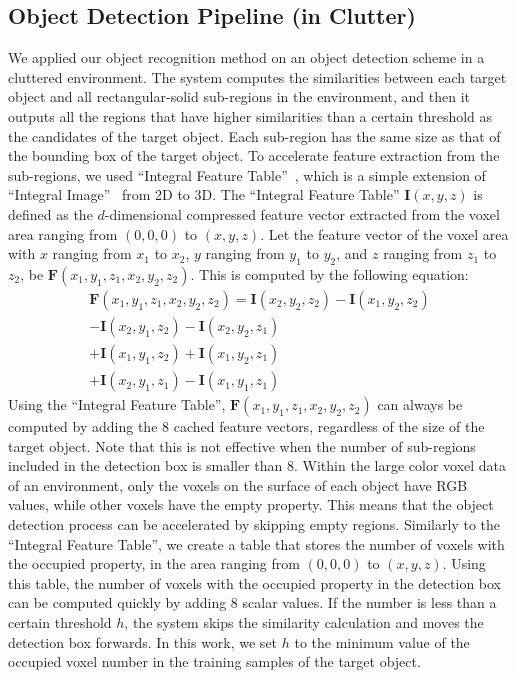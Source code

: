 \documentclass[conference]{sty/IEEEtran}
\begin{document}
\subsection{Object Detection Pipeline (in Clutter)}
\label{sec:recognition}
We applied our object recognition method on an object detection scheme in a cluttered environment.
The system computes the similarities between each target object and all rectangular-solid sub-regions in the environment, and then it outputs all the regions that have higher similarities than a certain threshold as the candidates of the target object.
Each sub-region has the same size as that of the bounding box of the target object.
To accelerate feature extraction from the sub-regions, we used ``Integral Feature Table''~\cite{kanezaki2010tvc}, which is a simple extension of ``Integral Image''~\cite{viola2001} from 2D to 3D.
The ``Integral Feature Table'' $\bm{I}(x,y,z)$ is defined as the $d$-dimensional compressed feature vector extracted from the voxel area
    ranging from $(0,0,0)$ to $(x,y,z)$.
Let the feature vector of the voxel area with $x$ ranging from $x_1$ to $x_2$,
    $y$ ranging from $y_1$ to $y_2$, and $z$ ranging from $z_1$ to $z_2$, be $\bm{F}(x_1,y_1,z_1,x_2,y_2,z_2)$.
This is computed by the following equation:
\begin{eqnarray*}\label{eq:sat}
\bm{F}(x_1,y_1,z_1,x_2,y_2,z_2) = \bm{I}(x_2,y_2,z_2) - \bm{I}(x_1,y_2,z_2)
                           \\ - \bm{I}(x_2,y_1,z_2) - \bm{I}(x_2,y_2,z_1)
                           \\ + \bm{I}(x_1,y_1,z_2) + \bm{I}(x_1,y_2,z_1)
                           \\ + \bm{I}(x_2,y_1,z_1) - \bm{I}(x_1,y_1,z_1)
\end{eqnarray*}
Using the ``Integral Feature Table'', $\bm{F}(x_1,y_1,z_1,x_2,y_2,z_2)$ can always be computed by adding the 8 cached feature vectors,
    regardless of the size of the target object.
Note that this is not effective when the number of sub-regions included in the detection box is smaller than 8.
Within the large color voxel data of an environment,
   only the voxels on the surface of each object have RGB values, while other voxels have the empty property.
This means that the object detection process can be accelerated by skipping empty regions.
Similarly to the ``Integral Feature Table'', we create a table that stores
   the number of voxels with the occupied property, in the area ranging from $(0,0,0)$ to $(x,y,z)$.
Using this table, the number of voxels with the occupied property in the detection box can be computed quickly by adding 8 scalar values.
If the number is less than a certain threshold $h$,
   the system skips the similarity calculation and moves the detection box forwards.
In this work, we set $h$ to the minimum value of the occupied voxel number in the training samples of the target object.
\end{document}
